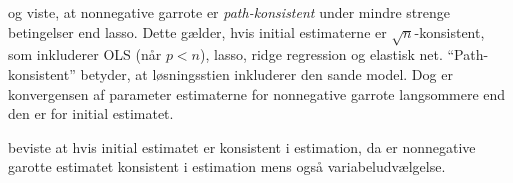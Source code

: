 \citep{nonnegative_garrote_2007} og \citep{zou_hastie} viste, at nonnegative garrote er \textit{path-konsistent} under mindre strenge betingelser end lasso.
Dette gælder, hvis initial estimaterne er \(\sqrt{n}\)-konsistent, som inkluderer OLS (når \(p < n\)), lasso, ridge regression og elastisk net.
``Path-konsistent'' betyder, at løsningsstien inkluderer den sande model.
Dog er konvergensen af parameter estimaterne for nonnegative garrote langsommere end den er for initial estimatet.


\citep{nonnegative_garrote_2007} beviste at hvis initial estimatet er konsistent i estimation, da er nonnegative garotte estimatet konsistent i estimation mens også variabeludvælgelse.
